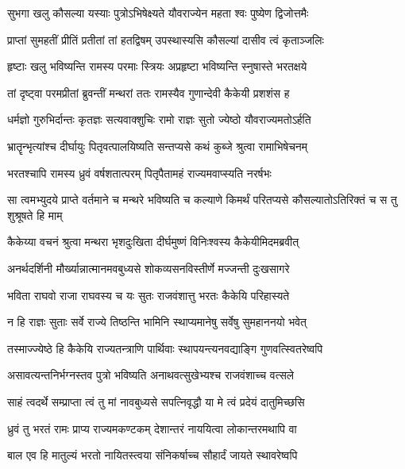 \twolineshloka
{सुभगा खलु कौसल्या यस्याः पुत्रोऽभिषेक्ष्यते}
{यौवराज्येन महता श्वः पुष्येण द्विजोत्तमैः} %

\twolineshloka
{प्राप्तां सुमहतीं प्रीतिं प्रतीतां तां हतद्विषम्}
{उपस्थास्यसि कौसल्यां दासीव त्वं कृताञ्जलिः} %

\twolineshloka
{हृष्टाः खलु भविष्यन्ति रामस्य परमाः स्त्रियः}
{अप्रहृष्टा भविष्यन्ति स्नुषास्ते भरतक्षये} %

\twolineshloka
{तां दृष्ट्वा परमप्रीतां ब्रुवन्तीं मन्थरां ततः}
{रामस्यैव गुणान्देवी कैकेयी प्रशशंस ह} %

\twolineshloka
{धर्मज्ञो गुरुभिर्दान्तः कृतज्ञः सत्यवाक्शुचिः}
{रामो राज्ञः सुतो ज्येष्ठो यौवराज्यमतोऽर्हति} %

\twolineshloka
{भ्रातॄन्भृत्यांश्च दीर्घायुः पितृवत्पालयिष्यति}
{सन्तप्यसे कथं कुब्जे श्रुत्वा रामाभिषेचनम्} %

\twolineshloka
{भरतश्चापि रामस्य ध्रुवं वर्षशतात्परम्}
{पितृपैतामहं राज्यमवाप्स्यति नरर्षभः} %

\threelineshloka
{सा त्वमभ्युदये प्राप्ते वर्तमाने च मन्थरे}
{भविष्यति च कल्याणे किमर्थं परितप्यसे}
{कौसल्यातोऽतिरिक्तं च स तु शुश्रूषते हि माम्} %

\twolineshloka
{कैकेय्या वचनं श्रुत्वा मन्थरा भृशदुःखिता}
{दीर्घमुष्णं विनिःश्वस्य कैकेयीमिदमब्रवीत्} %

\twolineshloka
{अनर्थदर्शिनी मौर्ख्यान्नात्मानमवबुध्यसे}
{शोकव्यसनविस्तीर्णे मज्जन्ती दुःखसागरे} %

\twolineshloka
{भविता राघवो राजा राघवस्य च यः सुतः}
{राजवंशात्तु भरतः कैकेयि परिहास्यते} %

\twolineshloka
{न हि राज्ञः सुताः सर्वे राज्ये तिष्ठन्ति भामिनि}
{स्थाप्यमानेषु सर्वेषु सुमहाननयो भवेत्} %

\twolineshloka
{तस्माज्ज्येष्ठे हि कैकेयि राज्यतन्त्राणि पार्थिवाः}
{स्थापयन्त्यनवद्याङ्गि गुणवत्स्वितरेष्वपि} %

\twolineshloka
{असावत्यन्तनिर्भग्नस्तव पुत्रो भविष्यति}
{अनाथवत्सुखेभ्यश्च राजवंशाच्च वत्सले} %

\twolineshloka
{साहं त्वदर्थे सम्प्राप्ता त्वं तु मां नावबुध्यसे}
{सपत्निवृद्धौ या मे त्वं प्रदेयं दातुमिच्छसि} %

\twolineshloka
{ध्रुवं तु भरतं रामः प्राप्य राज्यमकण्टकम्}
{देशान्तरं नाययित्वा लोकान्तरमथापि वा} %

\twolineshloka
{बाल एव हि मातुल्यं भरतो नायितस्त्वया}
{संनिकर्षाच्च सौहार्दं जायते स्थावरेष्वपि} %

